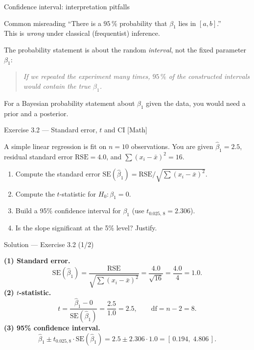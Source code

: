 \documentclass[aspectratio=169,11pt]{beamer}
\begin{document}
\begin{frame}{Confidence interval: interpretation pitfalls}
  \begin{alertblock}{Common misreading}
    ``There is a $95\,\%$ probability that $\beta_1$ lies in $[a, b]$.''
    \\[2pt]
    This is \emph{wrong} under classical (frequentist) inference.
  \end{alertblock}
  \begin{readme}
    The probability statement is about the random \emph{interval}, not
    the fixed parameter $\beta_1$:
    \begin{quote}
      \emph{If we repeated the experiment many times, $95\,\%$ of the
      constructed intervals would contain the true $\beta_1$.}
    \end{quote}
    For a Bayesian probability statement about $\beta_1$ given the
    data, you would need a prior and a posterior.
  \end{readme}
\end{frame}


\begin{frame}{Exercise 3.2 --- Standard error, $t$ and CI [Math]}
  \begin{exercise}
    A simple linear regression is fit on $n=10$ observations. You are
    given $\hat\beta_1 = 2.5$, residual standard error
    $\mathrm{RSE}=4.0$, and $\sum(x_i-\bar x)^2 = 16$.
    \begin{enumerate}
      \item Compute the standard error
            $\mathrm{SE}(\hat\beta_1)=\mathrm{RSE}/\sqrt{\sum(x_i-\bar x)^2}$.
      \item Compute the $t$-statistic for $H_0:\beta_1=0$.
      \item Build a 95\% confidence interval for $\beta_1$
            (use $t_{0.025,\,8}=2.306$).
      \item Is the slope significant at the 5\% level? Justify.
    \end{enumerate}
  \end{exercise}
\end{frame}

\begin{frame}{Solution --- Exercise 3.2 (1/2)}
  \begin{solutionbox}
    \scriptsize
    \textbf{(1) Standard error.}
    \[
      \mathrm{SE}(\hat\beta_1)=\frac{\mathrm{RSE}}{\sqrt{\sum(x_i-\bar x)^2}}
        =\frac{4.0}{\sqrt{16}}=\frac{4.0}{4}=1.0.
    \]
    \textbf{(2) $t$-statistic.}
    \[
      t=\frac{\hat\beta_1-0}{\mathrm{SE}(\hat\beta_1)}
       =\frac{2.5}{1.0}=2.5,\qquad \text{df}=n-2=8.
    \]
    \textbf{(3) 95\% confidence interval.}
    \[
      \hat\beta_1 \pm t_{0.025,8}\cdot\mathrm{SE}(\hat\beta_1)
      = 2.5 \pm 2.306\cdot 1.0 = [\,0.194,\; 4.806\,].
    \]
  \end{solutionbox}
\end{frame}
\end{document}

